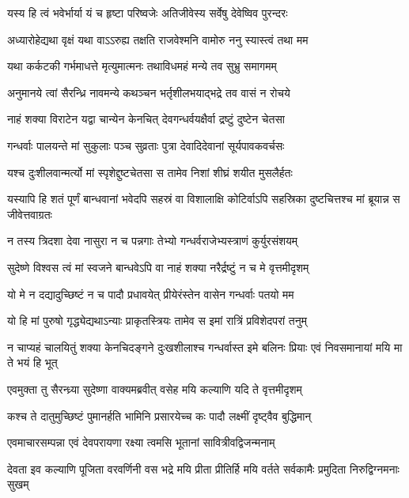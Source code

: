 \twolineshloka
{यस्य हि त्वं भवेर्भार्या यं च हृष्टा परिष्वजेः}
{अतिजीवेस्य सर्वेषु देवेष्विव पुरन्दरः}


\twolineshloka
{अध्यारोहेद्यथा वृक्षं यथा वाऽऽरुह्य तक्षति}
{राजवेश्मनि वामोरु ननु स्यास्त्वं तथा मम}


\twolineshloka
{यथा कर्कटकी गर्भमाधत्ते मृत्युमात्मनः}
{तथाविधमहं मन्ये तव सुभ्रु समागमम्}


\twolineshloka
{अनुमानये त्वां सैरन्ध्रि नावमन्ये कथञ्चन}
{भर्तृशीलभयाद्भद्रे तव वासं न रोचये}




\twolineshloka
{नाहं शक्या विराटेन यद्वा चान्येन केनचित्}
{देवगन्धर्वयक्षैर्वा द्रष्टुं दुष्टेन चेतसा}


\twolineshloka
{गन्धर्वाः पालयन्ते मां सुकुलाः पञ्च सुव्रताः}
{पुत्रा देवादिदेवानां सूर्यपावकवर्चसः}


\twolineshloka
{यश्च दुःशीलवान्मर्त्यो मां स्पृशेद्दुष्टचेतसा}
{स तामेव निशां शीघ्रं शयीत मुसलैर्हतः}


\threelineshloka
{यस्यापि हि शतं पूर्णं बान्धवानां भवेदपि}
{सहस्रं वा विशालाक्षि कोटिर्वाऽपि सहस्रिका}
{दुष्टचित्तश्च मां ब्रूयान्न स जीवेत्तवाग्रतः}


\twolineshloka
{न तस्य त्रिदशा देवा नासुरा न च पन्नगाः}
{तेभ्यो गन्धर्वराजेभ्यस्त्राणं कुर्युरसंशयम्}


\twolineshloka
{सुदेष्णे विश्वस त्वं मां स्वजने बान्धवेऽपि वा}
{नाहं शक्या नरैर्द्रष्टुं न च मे वृत्तमीदृशम्}


\twolineshloka
{यो मे न दद्यादुच्छिष्टं न च पादौ प्रधावयेत्}
{प्रीयेरंस्तेन वासेन गन्धर्वाः पतयो मम}


\twolineshloka
{यो हि मां पुरुषो गृद्ध्येद्यथाऽन्याः प्राकृतस्त्रियः}
{तामेव स इमां रात्रिं प्रविशेदपरां तनुम्}


\threelineshloka
{न चाप्यहं चालयितुं शक्या केनचिदङ्गने}
{दुःखशीलाश्च गन्धर्वास्त इमे बलिनः प्रियाः}
{एवं निवसमानायां मयि मा ते भयं हि भूत्}



\twolineshloka
{एवमुक्ता तु सैरन्ध्र्या सुदेष्णा वाक्यमब्रवीत्}
{वसेह मयि कल्याणि यदि ते वृत्तमीदृशम्}


\twolineshloka
{कश्च ते दातुमुच्छिष्टं पुमानर्हति भामिनि}
{प्रसारयेच्च कः पादौ लक्ष्मीं दृष्ट्वैव बुद्धिमान्}


\twolineshloka
{एवमाचारसम्पन्ना एवं देवपरायणा}
{रक्ष्या त्वमसि भूतानां सावित्रीवद्विजन्मनाम्}


\threelineshloka
{देवता इव कल्याणि पूजिता वरवर्णिनी}
{वस भद्रे मयि प्रीता प्रीतिर्हि मयि वर्तते}
{सर्वकामैः प्रमुदिता निरुद्विग्नमनाः सुखम्}



